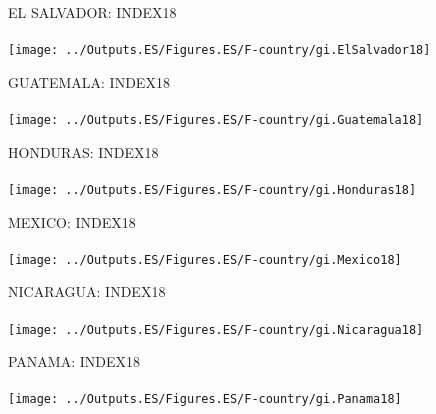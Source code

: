 \documentclass{beamer}
\begin{document}
\begin{frame}
\begin{figure}
		\centering
		EL SALVADOR: INDEX18\\~\\
		\texttt{[image: ../Outputs.ES/Figures.ES/F-country/gi.ElSalvador18]}
	\end{figure}
\end{frame}

\begin{frame}
	
	\begin{figure}
		\centering
		GUATEMALA: INDEX18\\~\\
		\texttt{[image: ../Outputs.ES/Figures.ES/F-country/gi.Guatemala18]}
	\end{figure}
\end{frame}
%
\begin{frame}
	
	\begin{figure}
		\centering
		HONDURAS: INDEX18\\~\\
		\texttt{[image: ../Outputs.ES/Figures.ES/F-country/gi.Honduras18]}
	\end{figure}
\end{frame}
%
\begin{frame}
	
	\begin{figure}
		\centering
		MEXICO: INDEX18\\~\\
		\texttt{[image: ../Outputs.ES/Figures.ES/F-country/gi.Mexico18]}
	\end{figure}
\end{frame}
%
\begin{frame}
	
	\begin{figure}
		\centering
		NICARAGUA: INDEX18\\~\\
		\texttt{[image: ../Outputs.ES/Figures.ES/F-country/gi.Nicaragua18]}
	\end{figure}
\end{frame}
%
\begin{frame}
	
	\begin{figure}
		\centering
		PANAMA: INDEX18\\~\\
		\texttt{[image: ../Outputs.ES/Figures.ES/F-country/gi.Panama18]}
	\end{figure}
\end{frame}
\end{document}
